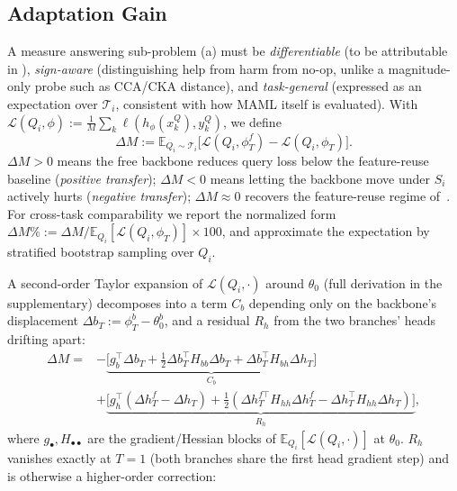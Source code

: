 \subsection{Adaptation Gain}
\label{sec:adaptation_gain}

A measure answering sub-problem (a) must be \emph{differentiable} (to be attributable in ), \emph{sign-aware} (distinguishing help from harm from no-op, unlike a magnitude-only probe such as CCA/CKA distance), and \emph{task-general} (expressed as an expectation over $\mathcal{T}_i$, consistent with how MAML itself is evaluated). With $\mathcal{L}(Q_i,\phi):=\frac{1}{M}\sum_k \ell(h_\phi(x_k^Q),y_k^Q)$, we define
\begin{equation}
    \Delta M := \mathbb{E}_{Q_i\sim\mathcal{T}_i}\!\big[\mathcal{L}(Q_i,\phi_T^{f}) - \mathcal{L}(Q_i,\phi_T)\big].
    \label{eq:adaptation_gain}
\end{equation}
$\Delta M{>}0$ means the free backbone reduces query loss below the feature-reuse baseline (\emph{positive transfer}); $\Delta M{<}0$ means letting the backbone move under $S_i$ actively hurts (\emph{negative transfer}); $\Delta M{\approx}0$ recovers the feature-reuse regime of~\cite{raghu2019rapid}. For cross-task comparability we report the normalized form $\Delta M\%:=\Delta M/\mathbb{E}_{Q_i}[\mathcal{L}(Q_i,\phi_T)]\times 100$, and approximate the expectation by stratified bootstrap sampling over $Q_i$.

A second-order Taylor expansion of $\mathcal{L}(Q_i,\cdot)$ around $\theta_0$ (full derivation in the supplementary) decomposes  into a term $C_b$ depending only on the backbone's displacement $\Delta b_T := \phi_T^b-\theta_0^b$, and a residual $R_h$ from the two branches' heads drifting apart:
\begingroup\small
\begin{equation}
\begin{split}
    \Delta M = &-\underbrace{\big[g_b^\top\Delta b_T+\tfrac{1}{2}\Delta b_T^\top H_{bb}\Delta b_T+\Delta b_T^\top H_{bh}\Delta h_T\big]}_{C_b}\\
    &+\underbrace{\big[g_h^\top(\Delta h_T^f{-}\Delta h_T)+\tfrac12(\Delta h_T^{f\top} H_{hh}\Delta h_T^f{-}\Delta h_T^\top H_{hh}\Delta h_T)\big]}_{R_h},
\end{split}
\label{eq:decomposition}
\end{equation}
\endgroup
where $g_\bullet,H_{\bullet\bullet}$ are the gradient/Hessian blocks of $\mathbb{E}_{Q_i}[\mathcal{L}(Q_i,\cdot)]$ at $\theta_0$. $R_h$ vanishes exactly at $T{=}1$ (both branches share the first head gradient step) and is otherwise a higher-order correction:

